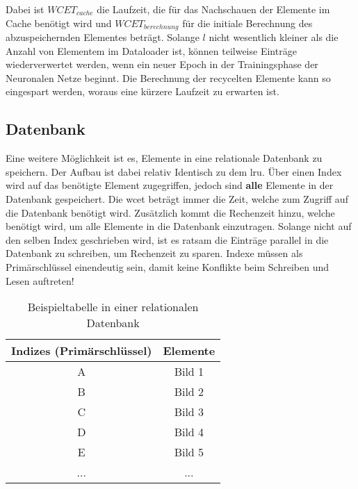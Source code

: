 Dabei ist $WCET_{cache}$ die Laufzeit, die für das Nachschauen der Elemente im Cache benötigt wird und $WCET_{berechnung}$ für die initiale Berechnung des abzuspeichernden Elementes beträgt. Solange $l$ nicht wesentlich kleiner als die Anzahl von Elementem im Dataloader ist, können teilweise Einträge wiederverwertet werden, wenn ein neuer Epoch in der Trainingsphase der Neuronalen Netze beginnt. Die Berechnung der recycelten Elemente kann so eingespart werden, woraus eine kürzere Laufzeit zu erwarten ist.






\subsection{Datenbank}\label{database}
Eine weitere Möglichkeit ist es, Elemente in eine relationale Datenbank zu speichern. Der Aufbau ist dabei relativ Identisch zu dem \ac{lru}. Über einen Index wird auf das benötigte Element zugegriffen, jedoch sind \textbf{alle} Elemente in der Datenbank gespeichert. Die \ac{wcet} beträgt immer die Zeit, welche zum Zugriff auf die Datenbank benötigt wird. Zusätzlich kommt die Rechenzeit hinzu, welche benötigt wird, um alle Elemente in die Datenbank einzutragen. Solange nicht auf den selben Index geschrieben wird, ist es ratsam die Einträge parallel in die Datenbank zu schreiben, um Rechenzeit zu sparen. Indexe müssen als Primärschlüssel einendeutig sein, damit keine Konflikte beim Schreiben und Lesen auftreten!

\begin{table}[h]\vspace{1ex}\centering
  \begin{tabular*}{9cm}{c|c}
  \textbf{Indizes (Primärschlüssel)} & \textbf{Elemente}
  \\\hline
  A   &  Bild 1 \\
  B   &  Bild 2 \\
  C   &  Bild 3 \\
  D   &  Bild 4 \\
  E   &  Bild 5 \\
  ... & ...

  \\\hline
  \end{tabular*}
  \caption[Beispieltabelle in einer relationalen Datenbank]{Beispieltabelle in einer relationalen Datenbank}\label{cap:database}
\vspace{2ex}\end{table}\label{table:database}


